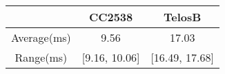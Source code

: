 \begin{tabular}{|c|c|c|}
	\hline
			& CC2538	& TelosB \\ 
	\hline
	Average(ms)	& 9.56		& 17.03 \\ 
	\hline
	Range(ms)	& [9.16, 10.06]	& [16.49, 17.68]	\\
	\hline
\end{tabular}

